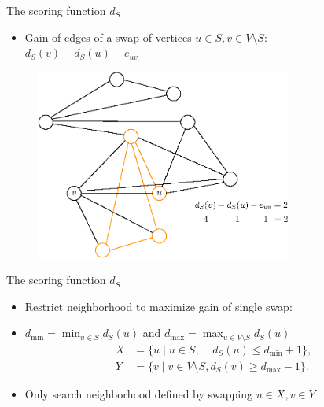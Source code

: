 \documentclass{beamer}
\begin{document}
\begin{frame}{The scoring function $d_S$}
    \begin{itemize}
        \item Gain of edges of a swap of vertices $u \in S, v \in V \setminus S$: \\
         $d_S(v) - d_S(u) - e_{uv}$
    \end{itemize}
    \begin{figure}
        \centering
        \includegraphics[width=0.75\textwidth]{graphics/ds1-1.eps}
    \end{figure}
\end{frame}

\begin{frame}{The scoring function $d_S$}
    \begin{itemize}
        \item Restrict neighborhood to maximize gain of single swap:
        \item $d_{\min} = \min_{u \in S} d_S(u)$ and $d_{\max} = \max_{u \in V \setminus S} d_S(u)$
        \begin{align*}
            X &= \{ u \mid u \in S,~~~~~ d_S(u) \leq d_{\min} + 1 \}, \\
            Y &= \{ v \mid v \in V \setminus S, d_S(v) \geq d_{\max} - 1 \}.
        \end{align*}
        \item Only search neighborhood defined by swapping $u \in X, v \in Y$
    \end{itemize}
\end{frame}
\end{document}
